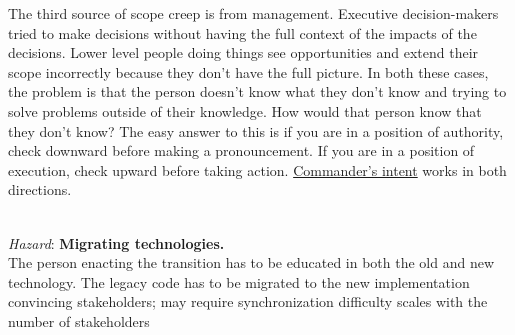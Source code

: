 The third source of scope creep is from management. Executive decision-makers tried to make decisions without having the full context of the impacts of the decisions. Lower level people doing things see opportunities and extend their scope incorrectly because they don't have the full picture. In both these cases, the problem is that the person doesn't know what they don't know and trying to solve problems outside of their knowledge. How would that person know that they don't know? The easy answer to this is if you are in a position of authority, check downward before making a pronouncement. If you are in a position of execution, check upward before taking action. \href{https://en.wikipedia.org/wiki/Intent_(military)#Commander's_intent}{Commander's intent}
works in both directions.

\ \\
\textit{Hazard}: \textbf{Migrating technologies.} \\
The person enacting the transition has to be educated in both the old and new technology. 
The legacy code has to be migrated to the new implementation
convincing stakeholders; may require synchronization
difficulty scales with the number of stakeholders 